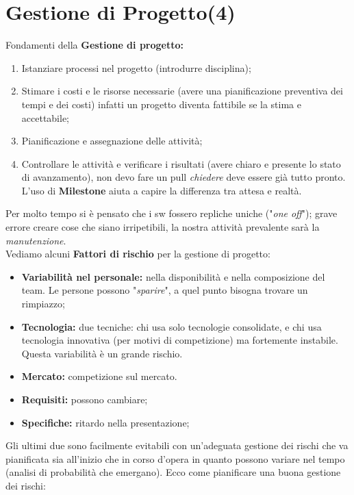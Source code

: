 


\section{Gestione di Progetto(4)}

Fondamenti della \textbf{Gestione di progetto:}
\begin{enumerate}
	\item Istanziare processi nel progetto (introdurre disciplina);
	\item Stimare i costi e le risorse necessarie (avere una pianificazione preventiva dei tempi e dei costi) infatti un progetto diventa fattibile se la stima e accettabile;
	\item Pianificazione e assegnazione delle attività;
	\item Controllare le attività e verificare i risultati (avere chiaro e presente lo stato di avanzamento), non devo fare un pull \textit{chiedere} deve essere già tutto pronto. L'uso di \textbf{Milestone} aiuta a capire la differenza tra attesa e realtà.
\end{enumerate}

Per molto tempo si è pensato che i sw fossero repliche uniche ("\textit{one off}"); grave errore creare cose che siano irripetibili, la nostra attività prevalente sarà la \textit{manutenzione}.\\

Vediamo alcuni \textbf{Fattori di rischio} per la gestione di progetto:

\begin{itemize}

	\item \textbf{Variabilità nel personale:} nella disponibilità e nella composizione del team. Le persone possono "\textit{sparire}", a quel punto bisogna trovare un rimpiazzo;
	
	\item \textbf{Tecnologia:} due tecniche: chi usa solo tecnologie consolidate, e chi usa tecnologia innovativa (per motivi di competizione) ma fortemente instabile. Questa variabilità è un grande rischio.
	
	\item \textbf{Mercato:} competizione sul mercato.
	\item \textbf{Requisiti:} possono cambiare;
	\item \textbf{Specifiche:} ritardo nella presentazione;

\end{itemize}
Gli ultimi due sono facilmente evitabili con un'adeguata gestione dei rischi che va pianificata sia all'inizio che in corso d'opera in quanto possono variare nel tempo (analisi di probabilità che emergano). Ecco come pianificare una buona gestione dei rischi:

